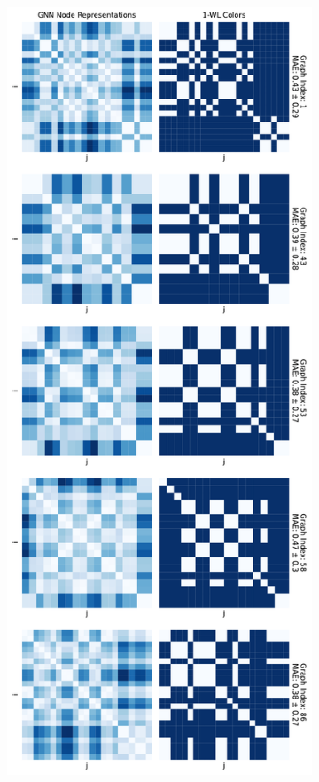 \begin{figure}[!ht]
\begin{subfigure}[b]{0.45992852703\textwidth}
        \includegraphics[width=\textwidth, left]{Figures/heatmaps_MUTAG_0.pdf}

\end{subfigure}
\end{figure}
